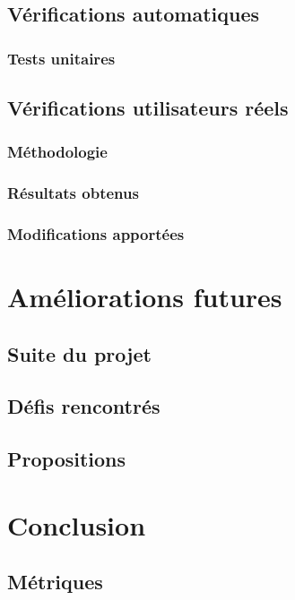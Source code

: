 \documentclass{EPL-master-thesis-covers-FR}
\begin{document}

		\section{Vérifications automatiques}

			\subsection*{Tests unitaires}

			

		\section{Vérifications utilisateurs réels}


			\subsection*{Méthodologie}

				

			\subsection*{Résultats obtenus}

				

			\subsection*{Modifications apportées}

		

	\chapter{Améliorations futures}


		\section{Suite du projet}
			\label{ref:suite_projet}

		

		\section{Défis rencontrés}

			

		\section{Propositions}

			
	\chapter{Conclusion}

		

		\section{Métriques}
		

	{}
	
		

	

	\setlength{\parskip}{0em}
	\backcoverpage
\end{document}
